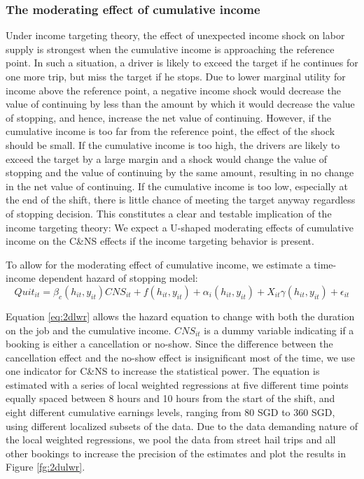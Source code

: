 \documentclass[reviewmode,AEJ]{AEA}
\begin{document}
\subsubsection{The moderating effect of cumulative income} Under income targeting theory, the effect of unexpected income shock on labor supply is strongest when the cumulative income is approaching the reference point. In such a situation, a driver is likely to exceed the target if he continues for one more trip, but  miss the target if he stops. Due to lower marginal utility for income above the reference point, a negative income shock would decrease the value of continuing by less than the amount by which it would decrease the value of stopping, and hence, increase the net value of continuing. However, if the cumulative income is too far from the reference point, the effect of the shock should be small. If the cumulative income is too high, the drivers are likely to exceed the target by a large margin and a shock would change the value of stopping and the value of continuing by the same amount, resulting in no change in the net value of continuing. If the cumulative income is too low, especially at the end of the shift, there is little chance of meeting the target anyway regardless of stopping decision. This constitutes a clear and testable implication of the income targeting theory: We expect a U-shaped moderating effects of cumulative income on the C\&NS effects if the income targeting behavior is present.

To allow for the moderating effect of cumulative income, we estimate a time-income dependent hazard of stopping model:
\begin{equation}
    \label{eq:2dlwr}
    Quit_{it} = \beta_c(h_{it}, y_{it}) {CNS}_{it} + f(h_{it}, y_{it}) + \alpha_{i}(h_{it}, y_{it}) + X_{it}\gamma(h_{it}, y_{it}) + \epsilon_{it}
\end{equation}

Equation \eqref{eq:2dlwr} allows the hazard equation to change with both the duration on the job and the cumulative income. $CNS_{it}$ is a dummy variable indicating if a booking is either a cancellation or no-show.  Since the difference between the cancellation effect and the no-show effect is insignificant most of the time, we %
use one indicator for C\&NS to increase the statistical power. The equation is estimated with a series of local weighted regressions at five different time points equally spaced between 8 hours and 10 hours from the start of the shift, and eight different cumulative earnings levels, ranging from 80 SGD to 360 SGD, using different localized subsets of the data.  %
 Due to the data demanding nature of the local weighted regressions, we  pool the data from street hail trips and all other bookings to increase the precision of the estimates and plot the results in Figure \ref{fg:2dulwr}.%
\end{document}
